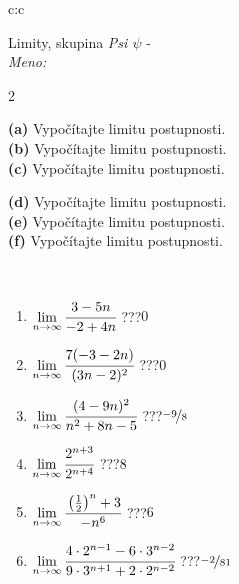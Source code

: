 \documentclass[10pt]{report}
\begin{document}
\newpage
\thispagestyle{empty}
\begin{tabular}{c:c}
\begin{minipage}[c][104.5mm][t]{0.5\linewidth}
\begin{center}
\vspace{5mm}
{\huge Limity, skupina \textit{Psi $\psi$} -}\\[5mm]
\textit{Meno:}\phantom{xxxxxxxxxxxxxxxxxxxxxxxxxxxxxxxxxxxxxxxxxxxxxxxxxxxxxxxxxxxxxxxxx}\\[5mm]
\begin{minipage}{0.95\linewidth}
\begin{center}
{\small \begin{multicols}{2} \raggedright
\textbf{(a)} Vypočítajte limitu postupnosti. \\[1mm]
\textbf{(b)} Vypočítajte limitu postupnosti. \\[1mm]
\textbf{(c)} Vypočítajte limitu postupnosti. \par \columnbreak
\textbf{(d)} Vypočítajte limitu postupnosti. \\[1mm]
\textbf{(e)} Vypočítajte limitu postupnosti. \\[1mm]
\textbf{(f)} Vypočítajte limitu postupnosti.
\end{multicols}
}
\end{center}
\end{minipage}
\\[1mm]
\begin{minipage}{0.79\linewidth}
\begin{center}
\begin{varwidth}{\linewidth}
\setlength{\itemsep}{0pt}
\begin{enumerate}
\footnotesizerr
\item $\lim\limits_{n\to\infty}\cfrac{3-5n}{-2+4n}$\quad \dotfill\; ???\;\dotfill \quad $0$
\item $\lim\limits_{n\to\infty}\cfrac{7(-3-2n)}{(3n-2)^2}$\quad \dotfill\; ???\;\dotfill \quad $0$
\item $\lim\limits_{n\to\infty}\cfrac{(4-9n)^2}{n^2+8n-5}$\quad \dotfill\; ???\;\dotfill \quad $\nicefrac{-9}{8}$
\item $\lim\limits_{n\to\infty}\cfrac{2^{n+3}}{2^{n+4}}$\quad \dotfill\; ???\;\dotfill \quad $8$
\item $\lim\limits_{n\to\infty}\cfrac{\left(\frac{1}{2}\right)^n +3}{-n^{6}}$\quad \dotfill\; ???\;\dotfill \quad $6$
\item $\lim\limits_{n\to\infty}\cfrac{4\cdot 2^{n-1}-6\cdot 3^{n-2}}{9\cdot 3^{n+1}+2\cdot 2^{n-2}}$\quad \dotfill\; ???\;\dotfill \quad $\nicefrac{-2}{81}$

\end{enumerate}
\end{varwidth}
\end{center}
\end{minipage}
\end{center}
\end{minipage}
\end{tabular}
\end{document}
